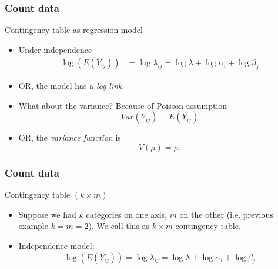 \documentclass[handout]{beamer}
\begin{document}

   \begin{frame} \frametitle{Count data}

   \begin{block}
   {Contingency table as regression model}
   \begin{itemize}
   \item     Under independence
   $$
   \begin{aligned}
     \log(E (Y_{ij} )) &= \log \lambda_{ij} = \log \lambda  + \log \alpha_i + \log \beta_j
   \end{aligned}
   $$

   \item     OR, the model has a {\em log link}.

   \item     What about the variance? Because of Poisson assumption
          $$                  Var(Y_{ij} ) = E (Y_{ij})$$

        \item     OR, the {\em variance function} is
                             $$V (\mu) = \mu.$$
   \end{itemize}
   \end{block}
   \end{frame}


   \begin{frame} \frametitle{Count data}

   \begin{block}
       {Contingency table $(k \times m)$}
       \begin{itemize}
       \item     Suppose we had $k$ categories on one axis, $m$ on the other
       (i.e. previous example $k = m = 2$). We call this as $k \times m$
       contingency table.

     \item Independence model:
   $$        \log(E (Y_{ij} )) = \log \lambda_{ij} = \log \lambda  + \log \alpha_i + \log \beta_j$$



       \end{itemize}
   \end{block}
   \end{frame}

\end{document}
